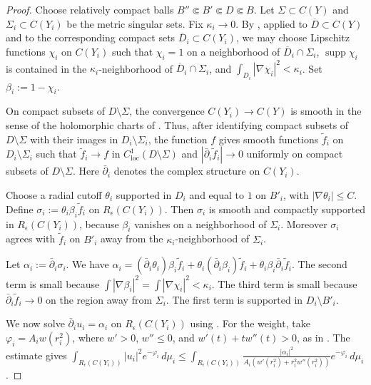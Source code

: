 \documentclass[11pt]{amsart}
\theoremstyle{definition}
\theoremstyle{remark}
\begin{document}
\begin{proof}
Choose relatively compact balls $B''\Subset B'\Subset D\Subset B$. Let $\Sigma\subset C(Y)$ and $\Sigma_i\subset C(Y_i)$ be the metric singular sets. Fix $\kappa_i\to0$. By \cite[Appendix, Proposition 5.1]{SLI}, applied to $\overline D\subset C(Y)$ and to the corresponding compact sets $\overline D_i\subset C(Y_i)$, we may choose Lipschitz functions $\chi_i$ on $C(Y_i)$ such that $\chi_i=1$ on a neighborhood of $\overline D_i\cap\Sigma_i$, $\operatorname{supp}\chi_i$ is contained in the $\kappa_i$-neighborhood of $\overline D_i\cap\Sigma_i$, and $\int_{D_i}|\nabla\chi_i|^2<\kappa_i$. Set $\beta_i:=1-\chi_i$.

On compact subsets of $D\setminus\Sigma$, the convergence $C(Y_i)\to C(Y)$ is smooth in the sense of the holomorphic charts of \cite[Theorem 1.4 and Proposition 2.4]{SLI}. Thus, after identifying compact subsets of $D\setminus\Sigma$ with their images in $D_i\setminus\Sigma_i$, the function $f$ gives smooth functions $\tilde f_i$ on $D_i\setminus\Sigma_i$ such that $\tilde f_i\to f$ in $C^1_{\mathrm{loc}}(D\setminus\Sigma)$ and $|\bar\partial_i\tilde f_i|\to0$ uniformly on compact subsets of $D\setminus\Sigma$. Here $\bar\partial_i$ denotes the complex structure on $C(Y_i)$.

Choose a radial cutoff $\theta_i$ supported in $D_i$ and equal to $1$ on $B'_i$, with $|\nabla\theta_i|\le C$. Define $\sigma_i:=\theta_i\beta_i\tilde f_i$ on $R_\epsilon(C(Y_i))$. Then $\sigma_i$ is smooth and compactly supported in $R_\epsilon(C(Y_i))$, because $\beta_i$ vanishes on a neighborhood of $\Sigma_i$. Moreover $\sigma_i$ agrees with $\tilde f_i$ on $B'_i$ away from the $\kappa_i$-neighborhood of $\Sigma_i$.

Let $\alpha_i:=\bar\partial_i\sigma_i$. We have $\alpha_i=(\bar\partial_i\theta_i)\beta_i\tilde f_i+\theta_i(\bar\partial_i\beta_i)\tilde f_i+\theta_i\beta_i\bar\partial_i\tilde f_i$. The second term is small because $\int|\nabla\beta_i|^2=\int|\nabla\chi_i|^2<\kappa_i$. The third term is small because $\bar\partial_i\tilde f_i\to0$ on the region away from $\Sigma_i$. The first term is supported in $D_i\setminus B'_i$.

We now solve $\bar\partial_i u_i=\alpha_i$ on $R_\epsilon(C(Y_i))$ using \cite[Proposition 5]{SLII}. For the weight, take $\varphi_i=A_i w(r_i^2)$, where $w'>0$, $w''\le0$, and $w'(t)+tw''(t)>0$, as in \cite[equation (3.1)]{SLII}. The estimate gives
$\int_{R_\epsilon(C(Y_i))}|u_i|^2e^{-\varphi_i}\,d\mu_i\le \int_{R_\epsilon(C(Y_i))}\frac{|\alpha_i|^2}{A_i(w'(r_i^2)+r_i^2w''(r_i^2))}e^{-\varphi_i}\,d\mu_i$.


\end{proof}
\end{document}
